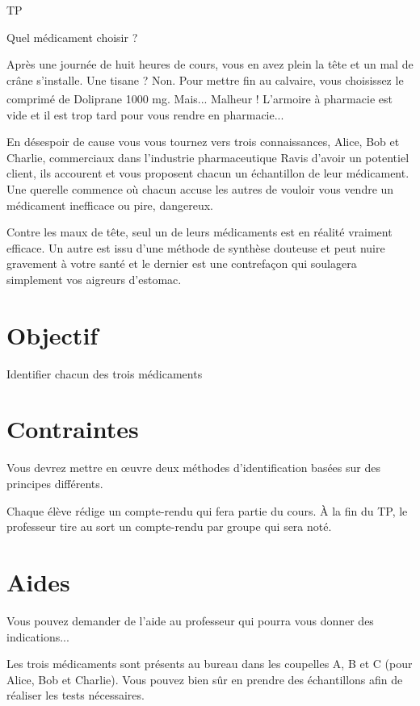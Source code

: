 \documentclass[12pt,a4paper]{article}
\begin{document}
\begin{header}
TP

Quel médicament choisir ?
\end{header}

Après une journée de huit heures de cours, vous en avez plein la tête et un mal de crâne s'installe.
Une tisane ?
Non.
Pour mettre fin au calvaire, vous choisissez le comprimé de Doliprane\textsuperscript{\textregistered}
1000 mg.
Mais...
Malheur !
L'armoire à pharmacie est vide et il est trop tard pour vous rendre en pharmacie...

En désespoir de cause vous vous tournez vers trois connaissances,  Alice, Bob et Charlie, commerciaux dans l'industrie pharmaceutique
Ravis d'avoir un potentiel client, ils accourent et vous proposent chacun un échantillon de leur médicament.
Une querelle commence où chacun accuse les autres de vouloir vous vendre un médicament inefficace ou pire, dangereux.

Contre les maux de tête, seul un de leurs médicaments est en réalité vraiment efficace.
Un autre est issu d'une méthode de synthèse douteuse et peut nuire gravement à votre santé et le dernier est une contrefaçon qui soulagera simplement vos aigreurs d'estomac.

\section*{Objectif}
\begin{objectif}
Identifier chacun des trois \og médicaments \fg{}
\end{objectif}

\section*{Contraintes}

Vous devrez mettre en œuvre deux méthodes d'identification basées sur des principes différents.

Chaque élève rédige un compte-rendu qui fera partie du cours.
À la fin du TP, le professeur tire au sort un compte-rendu par groupe qui sera noté.

\section*{Aides}

Vous pouvez demander de l'aide au professeur qui pourra vous donner des indications...

Les trois \og médicaments \fg{} sont présents au bureau dans les coupelles A, B et C (pour Alice, Bob et Charlie).
Vous pouvez bien sûr en prendre des échantillons afin de réaliser les tests nécessaires.
\end{document}
